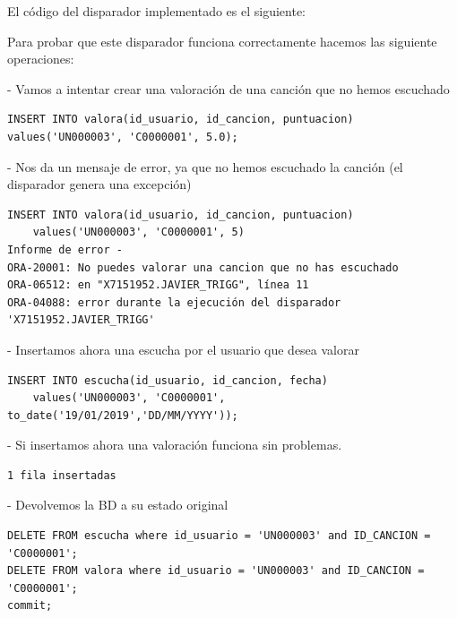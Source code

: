 \documentclass[12pt,a4paper]{article}
\begin{document}
El código del disparador implementado es el siguiente:



Para probar que este disparador funciona correctamente hacemos las siguiente operaciones:

- Vamos a intentar crear una valoración de una canción que no hemos escuchado
\begin{verbatim}
INSERT INTO valora(id_usuario, id_cancion, puntuacion) 
values('UN000003', 'C0000001', 5.0);
\end{verbatim}
- Nos da un mensaje de error, ya que no hemos escuchado la canción (el disparador genera una excepción)
\begin{verbatim}
INSERT INTO valora(id_usuario, id_cancion, puntuacion) 
	values('UN000003', 'C0000001', 5)
Informe de error -
ORA-20001: No puedes valorar una cancion que no has escuchado
ORA-06512: en "X7151952.JAVIER_TRIGG", línea 11
ORA-04088: error durante la ejecución del disparador 'X7151952.JAVIER_TRIGG'
\end{verbatim}

- Insertamos ahora una escucha por el usuario que desea valorar

\begin{verbatim}
INSERT INTO escucha(id_usuario, id_cancion, fecha) 
	values('UN000003', 'C0000001', to_date('19/01/2019','DD/MM/YYYY'));
\end{verbatim}
- Si insertamos ahora una valoración funciona sin problemas.
\begin{verbatim}
1 fila insertadas
\end{verbatim}

- Devolvemos la BD a su estado original
\begin{verbatim}
DELETE FROM escucha where id_usuario = 'UN000003' and ID_CANCION = 'C0000001';
DELETE FROM valora where id_usuario = 'UN000003' and ID_CANCION = 'C0000001';
commit;
\end{verbatim}
\end{document}
